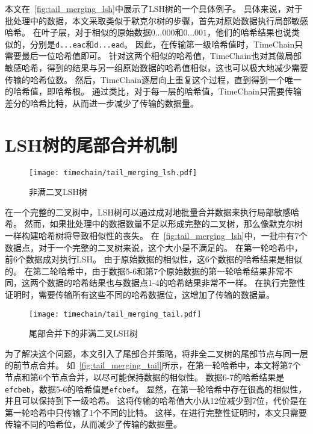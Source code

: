 本文在~\autoref{fig:tail_merging_lsh}中展示了LSH树的一个具体例子。
具体来说，对于批处理中的数据，本文采取类似于默克尔树的步骤，首先对原始数据执行局部敏感哈希。
在叶子层，对于相似的原始数据$0...000$和$0...001$，他们的哈希结果也说类似的，分别是\texttt{d...eac}和\texttt{d...ead}。
因此，在传输第一级哈希值时，TimeChain只需要最后一位哈希值即可。
针对这两个相似的哈希值，TimeChain也对其做局部敏感哈希，得到的结果与另一组原始数据的哈希值相似，这也可以极大地减少需要传输的哈希位数。
然后，TimeChain逐层向上重复这个过程，直到得到一个唯一的哈希值，即哈希根。
通过类比，对于每一层的哈希值，TimeChain只需要传输差分的哈希比特，从而进一步减少了传输的数据量。

\section{LSH树的尾部合并机制}

\begin{figure}[t]
    \centering
	\begin{minipage}{0.8\linewidth}
        \centering
        \texttt{[image: timechain/tail\_merging\_lsh.pdf]}
        \caption{非满二叉LSH树}
        \label{fig:tail_merging_lsh}
	\end{minipage}
\end{figure}

在一个完整的二叉树中，LSH树可以通过成对地批量合并数据来执行局部敏感哈希。
然而，如果批处理中的数据数量不足以形成完整的二叉树，那么像默克尔树一样构建哈希树将导致相似性的丧失。
在~\autoref{fig:tail_merging_lsh}中，一批中有7个数据点，对于一个完整的二叉树来说，这个大小是不满足的。
在第一轮哈希中，前6个数据成对执行LSH。
由于原始数据的相似性，这6个数据的哈希结果是相似的。
在第二轮哈希中，由于数据5-6和第7个原始数据的第一轮哈希结果非常不同，这两个数据的哈希结果也与数据点1-4的哈希结果非常不一样。
在执行完整性证明时，需要传输所有这些不同的哈希数据位，这增加了传输的数据量。

\begin{figure}[t]
    \centering
	\begin{minipage}{0.8\linewidth}
        \centering
        \texttt{[image: timechain/tail\_merging\_tail.pdf]}
	\end{minipage}
	\caption{尾部合并下的非满二叉LSH树}
	\label{fig:tail_merging_tail}
\end{figure}
为了解决这个问题，本文引入了尾部合并策略，将非全二叉树的尾部节点与同一层的前节点合并。
如~\autoref{fig:tail_merging_tail}所示，在第一轮哈希中，本文将第7个节点和第6个节点合并，以尽可能保持数据的相似性。
数据6-7的哈希结果是\texttt{efcbeb}，数据5-6的哈希值是\texttt{efcbef}。
显然，在第一轮哈希中存在很高的相似性，并且可以保持到下一级哈希。
这将传输的哈希值大小从12位减少到7位，代价是在第一轮哈希中只传输了1个不同的比特。
这样，在进行完整性证明时，本文只需要传输不同的哈希位，从而减少了传输的数据量。

